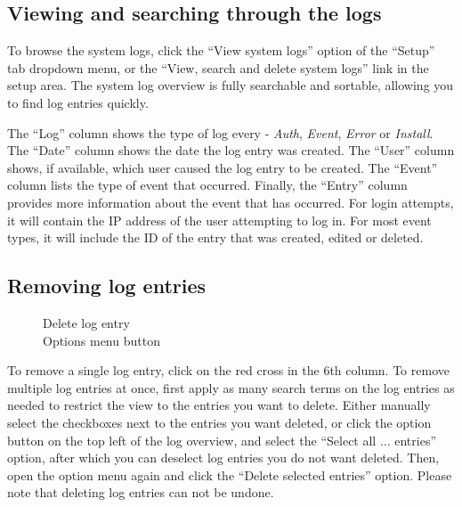 \documentclass[a4paper,oneside,openany,12pt]{memoir}
\begin{document}
\subsection{Viewing and searching through the logs}
To browse the system logs, click the ``View system logs'' option of the ``Setup'' tab dropdown menu,
 or the ``View, search and delete system logs'' link in the setup area.
The system log overview is fully searchable and sortable, allowing you to find log entries quickly.
\par
The ``Log'' column shows the type of log every - \emph{Auth}, \emph{Event}, \emph{Error} or \emph{Install}.
The ``Date'' column shows the date the log entry was created.
The ``User'' column shows, if available, which user caused the log entry to be created.
The ``Event'' column lists the type of event that occurred.
Finally, the ``Entry'' column provides more information about the event that has occurred.
For login attempts, it will contain the IP address of the user attempting to log in.
For most event types, it will include the ID of the entry that was created, edited or deleted.



\subsection{Removing log entries}
\begin{figure} %
  \vspace{-26pt}
  \begin{framed}
     Delete log entry\\
     Options menu button
  \end{framed}
\end{figure}
To remove a single log entry, click on the red cross in the 6th column.
To remove multiple log entries at once, first apply as many search terms on the log entries as needed to restrict the view to the entries you want to delete.
Either manually select the checkboxes next to the entries you want deleted,
 or click the option button on the top left of the log overview, and select the ``Select all ... entries'' option,
 after which you can deselect log entries you do not want deleted.
Then, open the option menu again and click the ``Delete selected entries'' option.
Please note that deleting log entries can not be undone.
\end{document}
